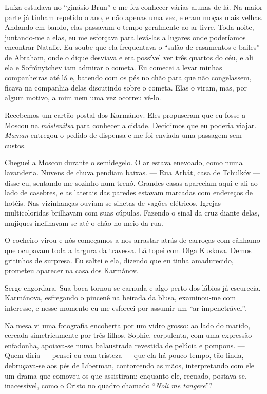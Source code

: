 Luíza estudava no ``ginásio Brun'' e me fez conhecer várias alunas de
lá. Na maior parte já tinham repetido o ano, e não apenas uma vez, e
eram moças mais velhas. Andando em bando, elas passavam o tempo
geralmente ao ar livre. Toda noite, juntando-me a elas, eu me esforçava
para levá-las a lugares onde poderíamos encontrar Natalie. Eu soube que
ela frequentava o ``salão de casamentos e bailes'' de Abraham, onde o
dique desviava e era possível ver três quartos do céu, e ali ela e
Sofrónytchev iam admirar o cometa. Eu comecei a levar minhas
companheiras até lá e, batendo com os pés no chão para que não
congelassem, ficava na companhia delas discutindo sobre o cometa. Elas o
viram, mas, por algum motivo, a mim nem uma vez ocorreu vê-lo.

Recebemos um cartão-postal dos Karmánov. Eles propuseram que eu fosse a
Moscou na \emph{máslenitsa} para conhecer a cidade. Decidimos que eu
poderia viajar. \emph{Maman} entregou o pedido de dispensa e me foi
enviada uma passagem sem custos.

Cheguei a Moscou durante o semidegelo. O ar estava enevoado, como numa
lavanderia. Nuvens de chuva pendiam baixas. --- Rua Arbát, casa de
Tchulkóv --- disse eu, sentando-me sozinho num trenó. Grandes casas
apareciam aqui e ali ao lado de casebres, e as laterais das paredes
estavam marcadas com endereços de hotéis. Nas vizinhanças ouviam-se
sinetas de vagões elétricos. Igrejas multicoloridas brilhavam com suas
cúpulas. Fazendo o sinal da cruz diante delas, mujiques inclinavam-se
até o chão no meio da rua.

O cocheiro virou e nós começamos a nos arrastar atrás de carroças com
cânhamo que ocupavam toda a largura da travessa. Lá topei com Olga
Kuskova. Demos gritinhos de surpresa. Eu saltei e ela, dizendo que eu
tinha amadurecido, prometeu aparecer na casa dos Karmánov.

Serge engordara. Sua boca tornou-se carnuda e algo perto dos lábios já
escurecia. Karmánova, esfregando o pincenê na beirada da blusa,
examinou-me com interesse, e nesse momento eu me esforcei por assumir um
``ar impenetrável''.

Na mesa vi uma fotografia encoberta por um vidro grosso: ao lado do
marido, cercada simetricamente por três filhos, Sophie, corpulenta, com
uma expressão enfadonha, apoiava-se numa balaustrada revestida de
pelúcia e pompons. --- Quem diria --- pensei eu com tristeza --- que ela
há pouco tempo, tão linda, debruçava-se aos pés de Liberman, contorcendo
as mãos, interpretando com ele um drama que comoveu os que assistiram;
enquanto ele, recuado, postava-se, inacessível, como o Cristo no quadro
chamado ``\emph{Noli me tangere}''?

